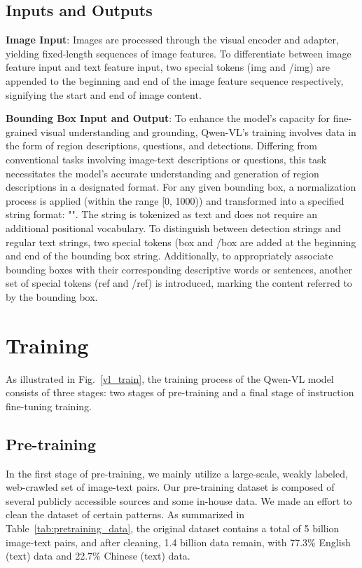 \documentclass{article}
\begin{document}
\subsection{Inputs and Outputs}
\textbf{Image Input}: Images are processed through the visual encoder and adapter, yielding fixed-length sequences of image features. To differentiate between image feature input and text feature input, two special tokens (img and /img) are appended to the beginning and end of the image feature sequence respectively, signifying the start and end of image content. 

\textbf{Bounding Box Input and Output}: To enhance the model's capacity for fine-grained visual understanding and grounding, Qwen-VL's training involves data in the form of region descriptions, questions, and detections. Differing from conventional tasks involving image-text descriptions or questions, this task necessitates the model's accurate understanding and generation of region descriptions in a designated format. For any given bounding box, a normalization process is applied (within the range [0, 1000)) and transformed into a specified string format: "". The string is tokenized as text and does not require an additional positional vocabulary. To distinguish between detection strings and regular text strings, two special tokens (box and /box are added at the beginning and end of the bounding box string. Additionally, to appropriately associate bounding boxes with their corresponding descriptive words or sentences, another set of special tokens (ref and /ref) is introduced, marking the content referred to by the bounding box.






\section{Training}
As illustrated in Fig.~\ref{vl_train}, the training process of the Qwen-VL model consists of three stages: two stages of pre-training and a final stage of instruction fine-tuning training.

\subsection{Pre-training}



In the first stage of pre-training, we mainly utilize a large-scale, weakly labeled, web-crawled set of image-text pairs. Our pre-training dataset is composed of several publicly accessible sources and some in-house data. We made an effort to clean the dataset of certain patterns. As summarized in Table~\ref{tab:pretraining_data}, the original dataset contains a total of 5 billion image-text pairs, and after cleaning, 1.4 billion data remain, with 77.3\% English (text) data and 22.7\% Chinese (text) data.
\end{document}
